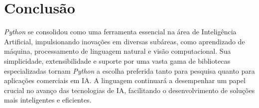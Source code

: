 \chapter{Conclusão}
\textit{Python} se consolidou como uma ferramenta essencial na área de Inteligência Artificial, impulsionando inovações em diversas subáreas, como aprendizado de máquina, processamento de linguagem natural e visão computacional. Sua simplicidade, extensibilidade e suporte por uma vasta gama de bibliotecas especializadas tornam \textit{Python} a escolha preferida tanto para pesquisa quanto para aplicações comerciais em IA. A linguagem continuará a desempenhar um papel crucial no avanço das tecnologias de IA, facilitando o desenvolvimento de soluções mais inteligentes e eficientes.